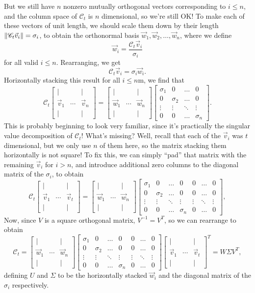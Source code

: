 \documentclass[letterpaper]{article}
\theoremstyle{remark}
\newcommand{\mat}[1]{\ensuremath{\begin{bmatrix}#1\end{bmatrix}}}
\begin{document}
But we still have $n$ nonzero mutually orthogonal vectors corresponding to $i \le n$, and the column space of $\mathscr{C}_t$ is $n$ dimensional, so we're still OK! To make each of these vectors of unit length, we should scale them down by their length $\norm{\mathscr{C}_t\vec{v}_i} = \sigma_i$, to obtain the orthonormal basis $\vec{w}_1, \vec{w}_2, \ldots, \vec{w}_n$, where we define
\[
    \vec{w}_i = \frac{\mathscr{C}_t\vec{v}_i}{\sigma_i}
\]
for all valid $i \le n$. Rearranging, we get
\[
    \mathscr{C}_t\vec{v}_i = \sigma_i\vec{w}_i.
\]
Horizontally stacking this result for all $i \le n$m, we find that
\[
    \mathscr{C}_t \mat{| & & | \\ \vec{v}_1 & \cdots & \vec{v}_n \\ | & & |} = \mat{| & & | \\ \vec{w}_1 & \cdots & \vec{w}_n \\ | & & |} \mat{\sigma_1 & 0 & \ldots &  0 \\ 0 & \sigma_2 & \ldots & 0 \\ \vdots & \vdots & \ddots & \vdots \\ 0 & 0 & \ldots & \sigma_n}.
\]
This is probably beginning to look very familiar, since it's practically the singular value decomposition of $\mathscr{C}_t$! What's missing? Well, recall that each of the $\vec{v}_i$ was $t$ dimensional, but we only use $n$ of them here, so the matrix stacking them horizontally is not square! To fix this, we can simply ``pad'' that matrix with the remaining $\vec{v}_i$ for $i > n$, and introduce additional zero columns to the diagonal matrix of the $\sigma_i$, to obtain
\[
    \mathscr{C}_t \mat{| & & | \\ \vec{v}_1 & \cdots & \vec{v}_t \\ | & & |} = \mat{| & & | \\ \vec{w}_1 & \cdots & \vec{w}_n \\ | & & |} \mat{\sigma_1 & 0 & \ldots & 0 & 0 & \ldots & 0 \\ 0 & \sigma_2 & \ldots & 0 & 0 & \ldots & 0 \\ \vdots & \vdots & \ddots & \vdots & \vdots & \ddots & \vdots \\ 0 & 0 & \ldots & \sigma_n & 0 & \ldots & 0},
\]
Now, since $V$ is a square orthogonal matrix, $V^{-1} = V^T$, so we can rearrange to obtain
\[
    \mathscr{C}_t = \mat{| & & | \\ \vec{w}_1 & \cdots & \vec{w}_n \\ | & & |} \mat{\sigma_1 & 0 & \ldots & 0 & 0 & \ldots & 0 \\ 0 & \sigma_2 & \ldots & 0 & 0 & \ldots & 0 \\ \vdots & \vdots & \ddots & \vdots & \vdots & \ddots & \vdots \\ 0 & 0 & \ldots & \sigma_n & 0 & \ldots & 0}\mat{| & & | \\ \vec{v}_1 & \cdots & \vec{v}_t \\ | & & |}^T = W\Sigma V^T,
\]
defining $U$ and $\Sigma$ to be the horizontally stacked $\vec{w}_i$ and the diagonal matrix of the $\sigma_i$ respectively.
\end{document}
